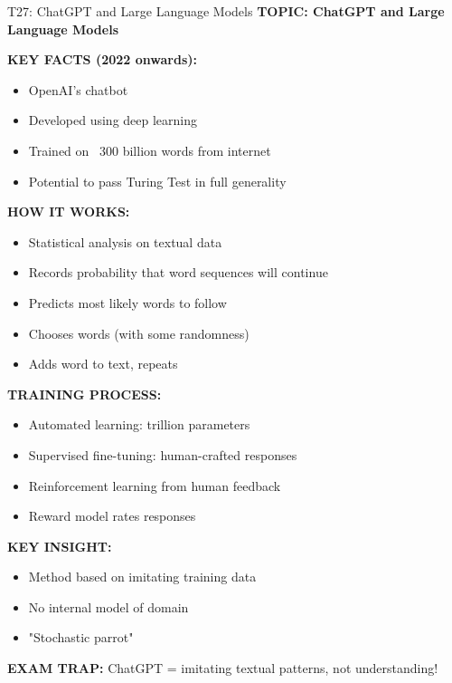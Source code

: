 \documentclass[8pt]{beamer}
\begin{document}
	\begin{frame}{T27: ChatGPT and Large Language Models}
		\fontsize{6.5}{7.5}\selectfont
		\textbf{TOPIC: ChatGPT and Large Language Models}
		
		\vspace{0.1cm}
		\textbf{KEY FACTS (2022 onwards):}
		\begin{itemize}
			\item OpenAI's chatbot
			\item Developed using deep learning
			\item Trained on ~300 billion words from internet
			\item Potential to pass Turing Test in full generality
		\end{itemize}
		
		\vspace{0.1cm}
		\textbf{HOW IT WORKS:}
		\begin{itemize}
			\item Statistical analysis on textual data
			\item Records probability that word sequences will continue
			\item Predicts most likely words to follow
			\item Chooses words (with some randomness)
			\item Adds word to text, repeats
		\end{itemize}
		
		\vspace{0.1cm}
		\textbf{TRAINING PROCESS:}
		\begin{itemize}
			\item Automated learning: trillion parameters
			\item Supervised fine-tuning: human-crafted responses
			\item Reinforcement learning from human feedback
			\item Reward model rates responses
		\end{itemize}
		
		\vspace{0.1cm}
		\textbf{KEY INSIGHT:}
		\begin{itemize}
			\item Method based on imitating training data
			\item No internal model of domain
			\item "Stochastic parrot"
		\end{itemize}
		
		\textcolor{myred}{\textbf{EXAM TRAP:}} ChatGPT = \textcolor{myblue}{imitating textual patterns}, not understanding!
	\end{frame}
	
\end{document}
